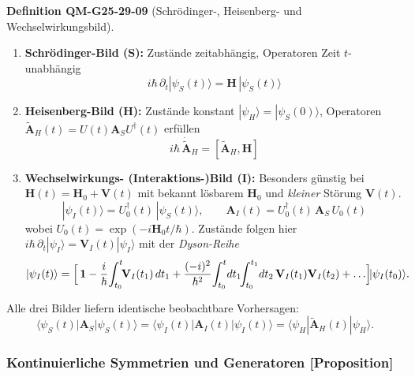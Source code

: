 \documentclass[10pt, letterpaper]{article}
\newcommand{\CustomHeading}[3]{%
  \par\medskip\noindent%
  \textbf{#1 #2} \textnormal{(#3)}.\enskip%
}
\newenvironment{DEF}[2]{\begin{unitbox}\CustomHeading{Definition}{#1}{#2}}{\end{unitbox}}
\begin{document}
\begin{DEF}{QM-G25-29-09}{Schrödinger-, Heisenberg- und Wechselwirkungsbild}
\begin{enumerate}
\item \textbf{Schrödinger-Bild (S):}  
      Zustände zeitabhängig, Operatoren Zeit $t$-unabhängig  
      $$i\hbar\,\partial_t|\psi_S(t)\rangle=\mathbf H\,|\psi_S(t)\rangle$$

\item \textbf{Heisenberg-Bild (H):}  
      Zustände konstant  
      $|\psi_H\rangle=|\psi_S(0)\rangle$,  
      Operatoren $\tilde{\mathbf A}_H(t)=U(t)\mathbf A_SU^\dagger(t)$ erfüllen  
      $$i\hbar\,\dot{\tilde{\mathbf A}}_H=[\tilde{\mathbf A}_H,\mathbf H]$$

\item \textbf{Wechselwirkungs- (Interaktions-)Bild (I):}  
      Besonders günstig bei $ \mathbf H(t)=\mathbf H_0+\mathbf V(t)$ mit
      bekannt lösbarem $\mathbf H_0$ und \emph{kleiner} Störung $\mathbf V(t)$.
      \[
      |\psi_I(t)\rangle=U_0^\dagger(t)\,|\psi_S(t)\rangle,
      \qquad
      \mathbf A_I(t)=U_0^\dagger(t)\,\mathbf A_S\,U_0(t)
      \]
      wobei $U_0(t)=\exp(-i\mathbf H_0 t/\hbar)$.
      Zustände folgen hier  
      $i\hbar\,\partial_t|\psi_I\rangle=\mathbf V_I(t)|\psi_I\rangle$
      mit der \emph{Dyson-Reihe}
      \[
      |\psi_I(t)\rangle
      =\Bigl[\,\mathbf 1
          -\frac{i}{\hbar}\!\int_{t_0}^t\!\!\mathbf V_I(t_1)\,dt_1
          +\frac{(-i)^2}{\hbar^2}\!\int_{t_0}^t\!dt_1\!\!\int_{t_0}^{t_1}\!dt_2\,
              \mathbf V_I(t_1)\mathbf V_I(t_2)+\ldots
        \Bigr]\!
        |\psi_I(t_0)\rangle .
      \]
\end{enumerate}

Alle drei Bilder liefern identische beobachtbare Vorhersagen:
\[
\langle\psi_S(t)|\mathbf A_S|\psi_S(t)\rangle
= \langle\psi_I(t)|\mathbf A_I(t)|\psi_I(t)\rangle
= \langle\psi_H|\tilde{\mathbf A}_H(t)|\psi_H\rangle.
\]
\end{DEF}


\subsubsection*{Kontinuierliche Symmetrien und Generatoren [Proposition]}
\end{document}
